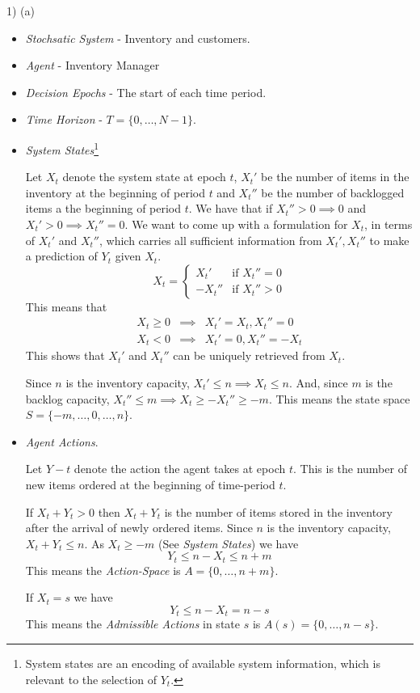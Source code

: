 \documentclass[11pt,a4paper]{article}
\begin{document}
\begin{answer}{1) (a)}
  \begin{itemize}
    \item \textit{Stochsatic System} - Inventory and customers.
    \item \textit{Agent} - Inventory Manager
    \item \textit{Decision Epochs} - The start of each time period.
    \item \textit{Time Horizon} - $T=\{0,\dots,N-1\}$.

    \item \textit{System States}\footnote{System states are an encoding of available system information, which is relevant to the selection of $Y_t$.}
    \par Let $X_t$ denote the system state at epoch $t$, $X_t'$ be the number of items in the inventory at the beginning of period $t$ and $X_t''$ be the number of backlogged items a the beginning of period $t$. We have that if ${X_t''>0\implies 0}$ and ${X_t'>0\implies X_t''=0}$. We want to come up with a formulation for $X_t$, in terms of $X_t'$ and $X_t''$, which carries all sufficient information from $X_t',X_t''$ to make a prediction of $Y_t$ given $X_t$.
    \[ X_t=\begin{cases}
      X_t'&\text{if }X_t''=0\\
      -X_t''&\text{if }X_t''>0
    \end{cases} \]
    This means that
    \[\begin{array}{rcl}
      X_t\geq0&\implies&X_t'=X_t,X_t''=0\\
      X_t<0&\implies&X_t'=0,X_t''=-X_t
    \end{array}\]
    This shows that $X_t'$ and $X_t''$ can be uniquely retrieved from $X_t$.
    \par Since $n$ is the inventory capacity, $X_t'\leq n\implies X_t\leq n$. And, since $m$ is the backlog capacity, $X_t''\leq m\implies X_t\geq-X_t''\geq-m$. This means the state space $S=\{-m,\dots,0,\dots,n\}$.

    \item \textit{Agent Actions}.
    \par Let $Y-t$ denote the action the agent takes at epoch $t$. This is the number of new items ordered at the beginning of time-period $t$.
    \par If $X_t+Y_t>0$ then $X_t+Y_t$ is the number of items stored in the inventory after the arrival of newly ordered items. Since $n$ is the inventory capacity, $X_t+Y_t\leq n$. As $X_t\geq-m$ (See \textit{System States}) we have
    \[ Y_t\leq n-X_t\leq n+m \]
    This means the \textit{Action-Space} is $A=\{0,\dots,n+m\}$.
    \par If $X_t=s$  we have
    \[ Y_t\leq n-X_t=n-s \]
    This means the \textit{Admissible Actions} in state $s$ is $A(s)=\{0,\dots,n-s\}$.


\end{itemize}
\end{answer}
\end{document}
